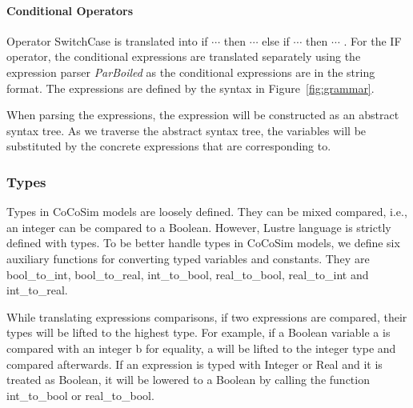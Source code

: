 \documentclass{article}
\begin{document}
\paragraph{Conditional Operators}
Operator SwitchCase is translated into \textsf{if $\cdots$ then $\cdots$ else if $\cdots$ then $\cdots$ }. 
For the IF operator, the conditional expressions are translated separately using the
expression parser \emph{ParBoiled} as the conditional expressions are in the string format. 
The expressions are defined by the syntax in Figure~\ref{fig:grammar}.

When parsing the expressions, the expression will be constructed as an abstract syntax tree. 
As we traverse the abstract syntax tree, the variables will be substituted by the concrete expressions
that are corresponding to.

\subsubsection{Types}

Types in CoCoSim models are loosely defined. 
They can be mixed compared, i.e., an integer can be compared to a Boolean.
However, Lustre language is strictly defined with types.
To be better handle types in CoCoSim models, we define six auxiliary functions
for converting typed variables and constants. 
They are \textsf{bool\_to\_int, bool\_to\_real, int\_to\_bool, 
real\_to\_bool, real\_to\_int} and \textsf{int\_to\_real}. 

While translating expressions comparisons, if two expressions are compared, 
their types will be lifted to the highest type. For example, if a Boolean variable \textsf{a} 
is compared with an integer \textsf{b} for equality, \textsf{a} will be lifted to the integer 
type and compared afterwards. 
If an expression is typed with Integer or Real and it is treated as Boolean,  it will be lowered 
to a Boolean by calling the function \textsf{int\_to\_bool} or \textsf{real\_to\_bool}.
 
\end{document}
